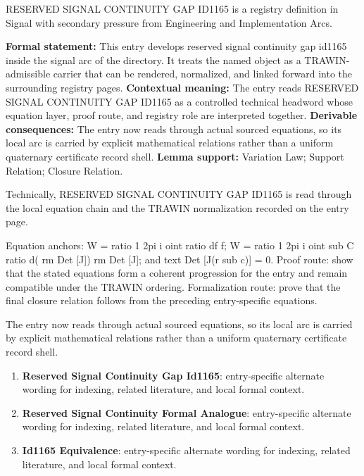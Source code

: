 
\begingroup\small
{}
RESERVED SIGNAL CONTINUITY GAP ID1165 is a registry definition in Signal with secondary pressure from Engineering and Implementation Arcs.

\begingroup\footnotesize\setlength{\emergencystretch}{3em}\sloppy
\textbf{Formal statement:} This entry develops reserved signal continuity gap id1165 inside the signal arc of the directory. It treats the named object as a TRAWIN-admissible carrier that can be rendered, normalized, and linked forward into the surrounding registry pages. \textbf{Contextual meaning:} The entry reads RESERVED SIGNAL CONTINUITY GAP ID1165 as a controlled technical headword whose equation layer, proof route, and registry role are interpreted together. \textbf{Derivable consequences:} The entry now reads through actual sourced equations, so its local arc is carried by explicit mathematical relations rather than a uniform quaternary certificate record shell. \textbf{Lemma support:} Variation Law; Support Relation; Closure Relation.\par
\endgroup

Technically, RESERVED SIGNAL CONTINUITY GAP ID1165 is read through the local equation chain and the TRAWIN normalization recorded on the entry page.

Equation anchors: W = ratio 1 2pi i oint ratio df f; W = ratio 1 2pi i oint sub C ratio d( rm Det [J]) rm Det [J]; and text Det [J(r sub c)] = 0. Proof route: show that the stated equations form a coherent progression for the entry and remain compatible under the TRAWIN ordering. Formalization route: prove that the final closure relation follows from the preceding entry-specific equations.

The entry now reads through actual sourced equations, so its local arc is carried by explicit mathematical relations rather than a uniform quaternary certificate record shell.
\endgroup

\begin{enumerate}[leftmargin=1.6em,itemsep=6pt,topsep=4pt]
\item \textbf{Reserved Signal Continuity Gap Id1165}: entry-specific alternate wording for indexing, related literature, and local formal context.
\item \textbf{Reserved Signal Continuity Formal Analogue}: entry-specific alternate wording for indexing, related literature, and local formal context.
\item \textbf{Id1165 Equivalence}: entry-specific alternate wording for indexing, related literature, and local formal context.
\end{enumerate}

